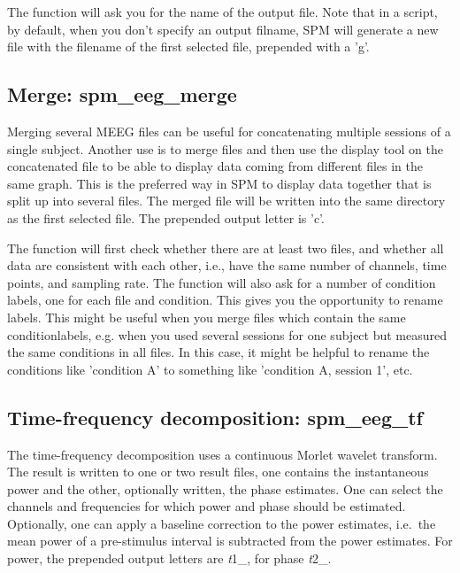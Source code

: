 The function will ask you for the name of the output file. Note that in a
script, by default, when you don't specify an output filname, 
SPM will generate a new file with the filename of the first selected file, 
prepended with a 'g'.

\subsection{Merge: spm\_eeg\_merge}
Merging several MEEG files can be useful for concatenating multiple
sessions of a single subject. Another use is to merge files and then
use the display tool on the concatenated file to be able to display
data coming from different files in the same graph. This is the
preferred way in SPM to display data together that is split up into
several files. The merged file will be written into the same directory
as the first selected file. The prepended output letter is 'c'.

The function will first check whether there are at least two files,
and whether all data are consistent with each other, i.e., have the 
same number of channels, time points, and sampling rate. The function 
will also ask for a number of condition labels, one for each file and 
condition. This gives you the opportunity to rename labels. This might
be useful when you merge files which contain the same conditionlabels,
e.g. when you used several sessions for one subject but measured the 
same conditions in all files. In this case, it might be helpful to 
rename the conditions like 'condition A' to something like 'condition A, session 1', 
etc.



\subsection{Time-frequency decomposition: spm\_eeg\_tf}
\label{sec:tf}
The time-frequency decomposition uses a continuous
Morlet wavelet transform. The result is written to one or two result
files, one contains the instantaneous power and the other, optionally
written, the phase estimates. One can select the channels and
frequencies for which power and phase should be estimated. Optionally,
one can apply a baseline correction to the power estimates, i.e.~the
mean power of a pre-stimulus interval is subtracted from the power
estimates. For power, the prepended output letters are {\textit
  t1\_}, for phase {\textit t2\_}.

